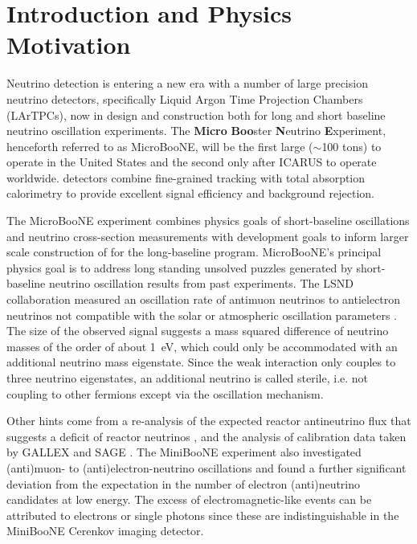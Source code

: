 \section{Introduction and Physics Motivation}

Neutrino detection is entering a new era with a number of large precision neutrino detectors, specifically Liquid Argon Time Projection Chambers (LArTPCs), now in design and construction both for long and short baseline neutrino oscillation experiments.  The {\bf{Micro}} {\bf{Boo}}ster {\bf{N}}eutrino {\bf{E}}xperiment, henceforth referred to as MicroBooNE, will be the first large ($\sim$100 tons) \lartpc to operate in the United States and the second only after ICARUS to operate worldwide.  \lartpc detectors combine fine-grained tracking with total absorption calorimetry to provide excellent signal efficiency and background rejection.  

The MicroBooNE experiment combines physics goals of short-baseline oscillations and neutrino cross-section measurements with development goals to inform larger scale construction of \lartpcs for the long-baseline program.  MicroBooNE's principal physics goal is to address long standing unsolved puzzles generated by short-baseline neutrino oscillation results from past experiments. The LSND collaboration measured an oscillation rate of antimuon neutrinos to antielectron neutrinos not compatible with the solar or atmospheric oscillation parameters \cite{solar}.  The size of the observed signal suggests a mass squared difference of neutrino masses of the order of  about 1~eV, which could only be accommodated with an additional neutrino mass eigenstate. Since the weak interaction only couples to three neutrino eigenstates, an additional neutrino is called sterile, i.e. not coupling to other fermions except via the oscillation mechanism. 

Other hints come from a re-analysis of the expected reactor antineutrino flux that suggests a deficit of reactor neutrinos \cite{reactor anomaly}, and the analysis of calibration data taken by GALLEX and SAGE \cite{gallexSage}. The MiniBooNE experiment \cite{miniboone} also investigated (anti)muon- to (anti)electron-neutrino oscillations and found a further significant deviation from the expectation in the number of electron (anti)neutrino candidates at low energy. The excess of electromagnetic-like events can be attributed to electrons or single photons since these are indistinguishable in the MiniBooNE Cerenkov imaging detector. 

